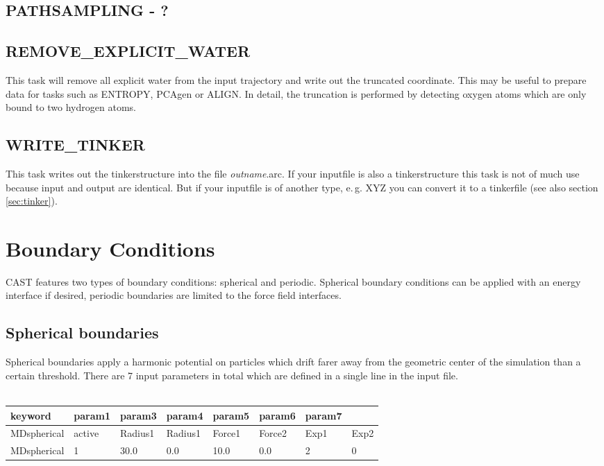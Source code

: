 \documentclass[10pt,a4paper]{article} %
\newif\ifdevmode %
\begin{document}
	\subsection{PATHSAMPLING - ?}	
	\ifdevmode \colorbox{red}{write something here} \fi	
	
	\subsection{REMOVE\_EXPLICIT\_WATER}	
	This task will remove all explicit water from the input trajectory and write out the truncated coordinate. This may be useful to prepare data for tasks such as ENTROPY, PCAgen or ALIGN. In detail, the truncation is performed by detecting oxygen atoms which are only bound to two hydrogen atoms.\\
	
	\subsection{WRITE\_TINKER}
	This task writes out the tinkerstructure into the file \textit{outname}.arc. If your inputfile is also a tinkerstructure this task is not of much use because input and output are identical. But if your inputfile is of another type, e.\,g. XYZ you can convert it to a tinkerfile (see also section \ref{sec:tinker}).
		

	\section{Boundary Conditions}
	\label{sec:boundary}
	\ac{CAST} features two types of boundary conditions: spherical and periodic. Spherical boundary conditions can be applied with an energy interface if desired, periodic boundaries are limited to the force field interfaces.

	\subsection{Spherical boundaries}
	Spherical boundaries apply a harmonic potential on particles which drift farer away from the geometric center of the simulation than a certain threshold. There are 7 input parameters in total which are defined in a single line in the input file. \\~\\

	\begin{tabularx}{\textwidth}{l|X|X|X|X|X|X|X}
		keyword & param1 & param3 & param4 & param5 & param6 & param7 \\
		\hline
		MDspherical & active & Radius1 & Radius1 & Force1 & Force2 & Exp1 & Exp2 \\
		MDspherical & 1 & 30.0 & 0.0 & 10.0 & 0.0 & 2 & 0 \\
	\end{tabularx}~\\
\end{document}
